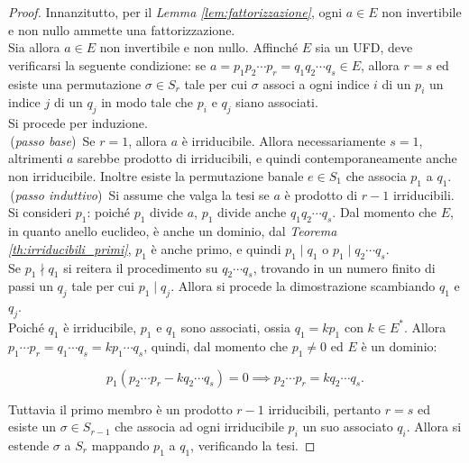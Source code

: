 \documentclass[11pt]{scrbook}
\begin{document}
\begin{proof}
    Innanzitutto, per il \textit{Lemma \ref{lem:fattorizzazione}}, ogni
    $a \in E$ non invertibile e non nullo ammette una fattorizzazione. \\

    Sia allora $a \in E$ non invertibile e non nullo. Affinché $E$ sia un UFD,
    deve verificarsi la seguente condizione: se
    $a=p_1p_2 \cdots p_r=q_1q_2 \cdots q_s \in E$, allora
    $r=s$ ed esiste una permutazione $\sigma \in S_r$ tale per cui
    $\sigma$ associ a ogni indice $i$ di un $p_i$ un indice $j$ di
    un $q_j$ in modo tale che $p_i$ e $q_j$ siano associati. \\

    Si procede per induzione. \\

    \,(\textit{passo base}) \,Se $r=1$, allora $a$ è irriducibile. Allora necessariamente
    $s=1$, altrimenti $a$ sarebbe prodotto di irriducibili, e quindi contemporaneamente
    anche non irriducibile. Inoltre esiste la permutazione banale $e \in S_1$ che
    associa $p_1$ a $q_1$. \\

    \,(\textit{passo induttivo}) \,Si assume che valga la tesi se $a$ è
    prodotto di $r-1$ irriducibili.
    Si consideri $p_1$: poiché $p_1$ divide $a$, $p_1$ divide anche
    $q_1q_2 \cdots q_s$. Dal momento che $E$, in quanto
    anello euclideo, è anche un dominio, dal \textit{Teorema \ref{th:irriducibili_primi}}, $p_1$ è anche primo,
    e quindi $p_1 \mid q_1$ o $p_1 \mid q_2 \cdots q_s$. \\

    Se $p_1 \nmid q_1$ si reitera il procedimento su $q_2 \cdots q_s$, trovando in
    un numero finito di passi un $q_j$ tale per cui $p_1 \mid q_j$. Allora si procede
    la dimostrazione scambiando $q_1$ e $q_j$. \\

    Poiché $q_1$ è irriducibile, $p_1$ e $q_1$ sono associati, ossia $q_1 = kp_1$ con
    $k \in E^*$. Allora $p_1 \cdots p_r = q_1 \cdots q_s = kp_1 \cdots q_s$, quindi,
    dal momento che $p_1 \neq 0$ ed $E$ è un dominio:

    \[p_1(p_2 \cdots p_r - kq_2 \cdots q_s)=0 \implies p_2 \cdots p_r = kq_2 \cdots q_s .\]

    Tuttavia il primo membro è un prodotto $r-1$ irriducibili, pertanto $r=s$ ed
    esiste un $\sigma \in S_{r-1}$ che associa ad ogni irriducibile $p_i$ un suo
    associato $q_i$. Allora si estende $\sigma$ a $S_r$ mappando $p_1$ a $q_1$,
    verificando la tesi.
\end{proof}
\end{document}
